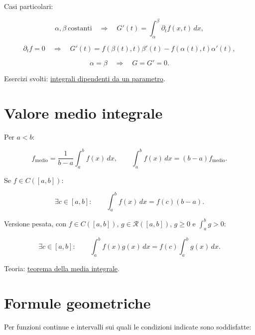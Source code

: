 Casi particolari:

\[
\alpha,\beta\ \text{costanti}
\quad\Longrightarrow\quad
G'(t)=\int_\alpha^\beta\partial_t f(x,t)\,dx,
\]

\[
\partial_t f=0
\quad\Longrightarrow\quad
G'(t)=f(\beta(t),t)\beta'(t)-f(\alpha(t),t)\alpha'(t),
\]

\[
\alpha=\beta
\quad\Longrightarrow\quad
G=G'=0.
\]

Esercizi svolti: \href{https://ingegnerismo.it/matematica/integrali-dipendenti-parametro-esercizi/}{integrali dipendenti da un parametro}.

\section{Valore medio integrale}\label{valore-medio-integrale}

Per \(a<b\):

\[
\displaystyle
f_{\mathrm{medio}}
=
\frac1{b-a}\int_a^b f(x)\,dx,
\qquad
\int_a^b f(x)\,dx=(b-a)f_{\mathrm{medio}}.
\]

Se \(f\in C([a,b])\):

\[
\displaystyle
\exists c\in[a,b]:
\qquad
\int_a^b f(x)\,dx=f(c)(b-a).
\]

Versione pesata, con \(f\in C([a,b])\), \(g\in\mathcal R([a,b])\), \(g\ge0\) e \(\int_a^b g>0\):

\[
\displaystyle
\exists c\in[a,b]:
\qquad
\int_a^b f(x)g(x)\,dx
=
f(c)\int_a^b g(x)\,dx.
\]

Teoria: \href{https://ingegnerismo.it/matematica/teorema-della-media-integrale/}{teorema della media integrale}.

\section{Formule geometriche}\label{formule-geometriche}

Per funzioni continue e intervalli sui quali le condizioni indicate sono soddisfatte:

